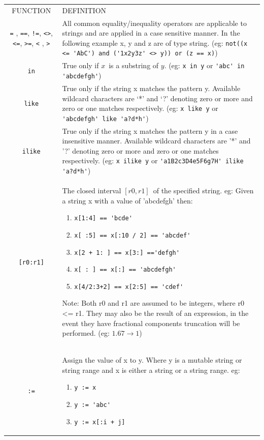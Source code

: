 \documentclass{book}
\begin{document}
{\newpage\clearpage
{}%
\begin{tabular}{|c|p{}|}
\hline
FUNCTION& DEFINITION\\
\verb'=' , \verb'==', \verb'!=', \verb'<>', \verb'<=', \verb'>=', \verb'<' , \verb'>'& All common equality/inequality operators are applicable to strings and are applied in a case sensitive manner. In the following example x, y and z are of type string. (eg: \verb"not((x <= 'AbC') and ('1x2y3z' <> y)) or (z == x)")\\
\verb'in'& True only if $x$\  is a substring of $y$. (eg: \verb'x in y' or \verb"'abc' in 'abcdefgh'")\\
\verb'like'& True only if the string x matches the pattern y.  Available wildcard characters are `*' and `?' denoting  zero or more and zero or one matches respectively.   (eg: \verb'x like y' or \verb"'abcdefgh' like 'a?d*h'")\\
\verb'ilike'& True only if the string x matches the pattern y in a case insensitive manner. Available wildcard characters are '*' and '?' denoting zero or more and zero or one  matches respectively. (eg: \verb'x ilike y' or \verb"'a1B2c3D4e5F6g7H' ilike 'a?d*h'")\\
\verb'[r0:r1]'& The closed interval $[r0,r1]$\  of the specified string.
eg: Given a string x with a value of 'abcdefgh' then:
\begin{enumerate}
\item \verb"x[1:4] == 'bcde'"
\item \verb"x[ :5] == x[:10 / 2] == 'abcdef'"
\item \verb"x[2 + 1: ] == x[3:] =='defgh'"
\item \verb"x[ : ] == x[:] == 'abcdefgh'"
\item \verb"x[4/2:3+2] == x[2:5] == 'cdef'"
\end{enumerate}
 Note: Both r0 and r1 are assumed to be integers, where r0 <= r1. They
 may also be the result of an expression, in the event they have
 fractional components truncation will be performed. (eg: $1.67
                \rightarrow 1$)\\
\verb':='& Assign the value of x to y. Where y is a mutable string  or
 string range and x is either a string or a string  range. eg:
 \begin{enumerate}
\item\verb'y := x'
\item\verb"y := 'abc'"
\item\verb'y := x[:i + j]'

\end{enumerate}
\end{tabular}}
\end{document}
